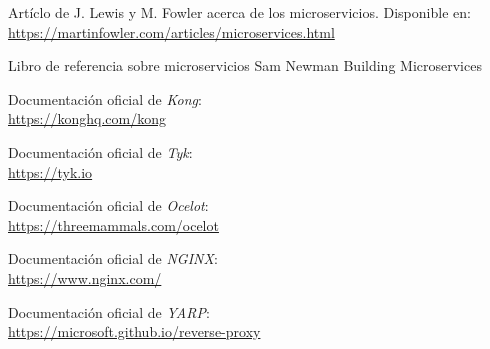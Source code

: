 \documentclass[11pt,spanish,listoffigures]{tfgetsinf}
\begin{document}

\begin{thebibliography}{10}

	Artíclo de J. Lewis y M. Fowler acerca de los microservicios.
	\newblock Disponible en:\\
	\url{https://martinfowler.com/articles/microservices.html}

	Libro de referencia sobre microservicios
	\newblock Sam Newman
	\newblock Building Microservices

	Documentación oficial de \emph{Kong}:\\
	\url{https://konghq.com/kong}

	Documentación oficial de \emph{Tyk}:\\
	\url{https://tyk.io}

	Documentación oficial de \emph{Ocelot}:\\
	\url{https://threemammals.com/ocelot}

	Documentación oficial de \emph{NGINX}:\\
	\url{https://www.nginx.com/}

	Documentación oficial de \emph{YARP}:\\
	\url{https://microsoft.github.io/reverse-proxy}

\end{thebibliography}
\end{document}
